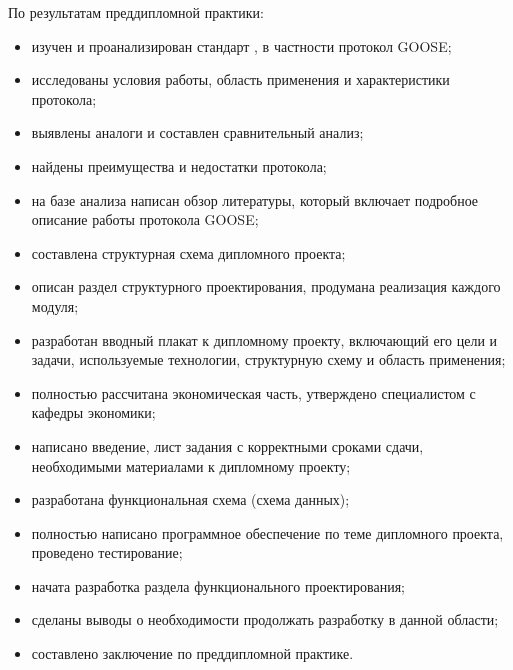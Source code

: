\label{sec:outro}

По результатам преддипломной практики:
\begin{itemize}
    \item изучен и проанализирован стандарт \iecStd, в частности протокол GOOSE;
    \item исследованы условия работы, область применения и характеристики протокола;
    \item выявлены аналоги и составлен сравнительный анализ;
    \item найдены преимущества и недостатки протокола;
    \item на базе анализа написан обзор литературы, который включает подробное описание работы протокола GOOSE;
    \item составлена структурная схема дипломного проекта;
    \item описан раздел структурного проектирования, продумана реализация каждого модуля;
    \item разработан вводный плакат к дипломному проекту, включающий его цели и задачи, используемые технологии, структурную схему и область применения;
    \item полностью рассчитана экономическая часть, утверждено специалистом с кафедры экономики;
    \item написано введение, лист задания с корректными сроками сдачи, необходимыми материалами к дипломному проекту;
    \item разработана функциональная схема (схема данных);
    \item полностью написано программное обеспечение по теме дипломного проекта, проведено тестирование;
    \item начата разработка раздела функционального проектирования;
    \item сделаны выводы о необходимости продолжать разработку в данной области;
    \item составлено заключение по преддипломной практике.
\end{itemize}
